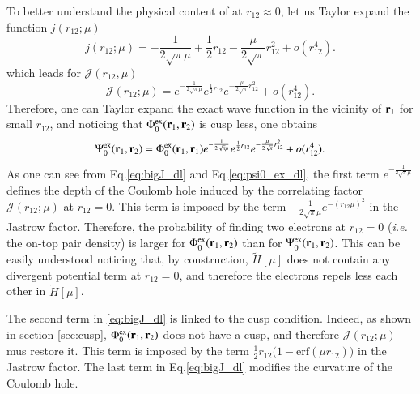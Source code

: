 \documentclass[aip,jcp,reprint,noshowkeys,superscriptaddress]{revtex4-1}
\newcommand{\br}[0]{{\bf {r}}}
\newcommand{\psiex}[0]{\Psi^{\text{ex}}_0}
\newcommand{\phiex}[0]{\Phi^{\text{ex}}_0}
\begin{document}
To better understand the physical content of at $r_{12}\approx 0$,  
let us Taylor expand the function $j(r_{12};\mu)$ 
\begin{equation}
 \label{eq:j_dl}
 j(r_{12};\mu) = -\frac{1}{2\sqrt{\pi}\mu} + \frac{1}{2}r_{12} - \frac{\mu}{2\sqrt{\pi}} r_{12}^2 + o(r_{12}^4).
\end{equation}
which leads for $\mathcal{J}(r_{12},\mu)$
\begin{equation}
 \label{eq:bigJ_dl}
 \mathcal{J}(r_{12};\mu) = e^{-\frac{1}{2\sqrt{\pi}\mu}} e^{ \frac{1}{2}r_{12}} e^{- \frac{\mu}{2\sqrt{\pi}} r_{12}^2} + o(r_{12}^4) .
\end{equation}
Therefore, one can Taylor expand the exact wave function in the vicinity of $\br{}_1$ for small $r_{12}$, and noticing that $\phiex(\br{}_1,\br{}_2) $ is cusp less, one obtains 
\begin{equation}
 \label{eq:psi0_ex_dl}
 \psiex(\br{}_1,\br{}_2) = \phiex(\br{}_1,\br{}_1)e^{-\frac{1}{2\sqrt{\pi}\mu}} e^{ \frac{1}{2}r_{12}} e^{- \frac{\mu}{2\sqrt{\pi}} r_{12}^2} + o(r_{12}^4) .
\end{equation}
As one can see from Eq.\eqref{eq:bigJ_dl} and Eq.\eqref{eq:psi0_ex_dl}, the first term $e^{-\frac{1}{2\sqrt{\pi}\mu}}$ defines the depth of the Coulomb hole induced by the correlating factor $\mathcal{J}(r_{12};\mu)$ at $r_{12}=0$. 
This term is imposed by the term $- \frac{1}{2\sqrt{\pi}\mu}e^{-(r_{12}\mu)^2}$ in the Jastrow factor. 
Therefore, the probability of finding two electrons at $r_{12}=0$ (\textit{i.e.} the on-top pair density) is larger for $\phiex(\br{}_1,\br{}_2)$ than for $\psiex(\br{}_1,\br{}_2)$.  
This can be easily understood noticing that, by construction, $\tilde{H}[\mu]$ does not contain any divergent potential term at $r_{12}=0$, and therefore the electrons repels less each other in  $\tilde{H}[\mu]$.  

The second term in \eqref{eq:bigJ_dl} is linked to the cusp condition. 
Indeed, as shown in section \ref{sec:cusp}, $\phiex(\br{}_1,\br{}_2)$ does not have a cusp, and therefore $\mathcal{J}(r_{12};\mu)$ mus restore it. This term is imposed by the term $\frac{1}{2}r_{12}\bigg( 1 - \text{erf}(\mu r_{12})  \bigg)$ in the Jastrow factor. 
The last term in Eq.\eqref{eq:bigJ_dl} modifies the curvature of the Coulomb hole. 
\end{document}
